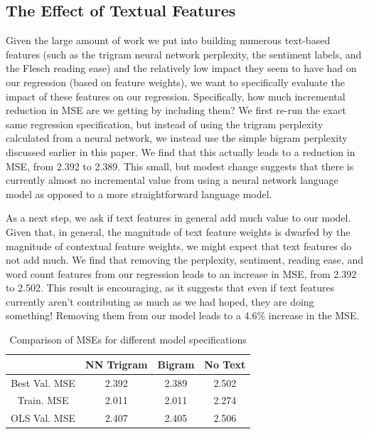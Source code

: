 \documentclass[fleqn,12pt]{SelfArx} %
\begin{document}
\subsection{The Effect of Textual Features}

Given the large amount of work we put into building numerous text-based features (such as the trigram neural network perplexity, the sentiment labels, and the Flesch reading ease) and the relatively low impact they seem to have had on our regression (based on feature weights), we want to specifically evaluate the impact of these features on our regression. Specifically, how much incremental reduction in MSE are we getting by including them? We first re-run the exact same regression specification, but instead of using the trigram perplexity calculated from a neural network, we instead use the simple bigram perplexity discussed earlier in this paper. We find that this actually leads to a reduction in MSE, from 2.392 to 2.389. This small, but modest change suggests that there is currently almost no incremental value from using a neural network language model as opposed to a more straightforward language model.

As a next step, we ask if text features in general add much value to our model. Given that, in general, the magnitude of text feature weights is dwarfed by the magnitude of contextual feature weights, we might expect that text features do not add much. We find that removing the perplexity, sentiment, reading ease, and word count features from our regression leads to an increase in MSE, from 2.392 to 2.502. This result is encouraging, as it suggests that even if text features currently aren't contributing as much as we had hoped, they are doing something! Removing them from our model leads to a 4.6\% increase in the MSE.

\begin{table}[hbt]
\caption{Comparison of MSEs for different model specifications}
\centering
\begin{tabular}{cccc}
\toprule
  & NN Trigram & Bigram & No Text\\
\midrule
Best Val. MSE & 2.392 & 2.389 &  2.502 \\
Train. MSE & 2.011 & 2.011 &  2.274 \\
OLS Val. MSE & 2.407 & 2.405 & 2.506 \\ 
\bottomrule
\end{tabular}
\end{table}
\end{document}
